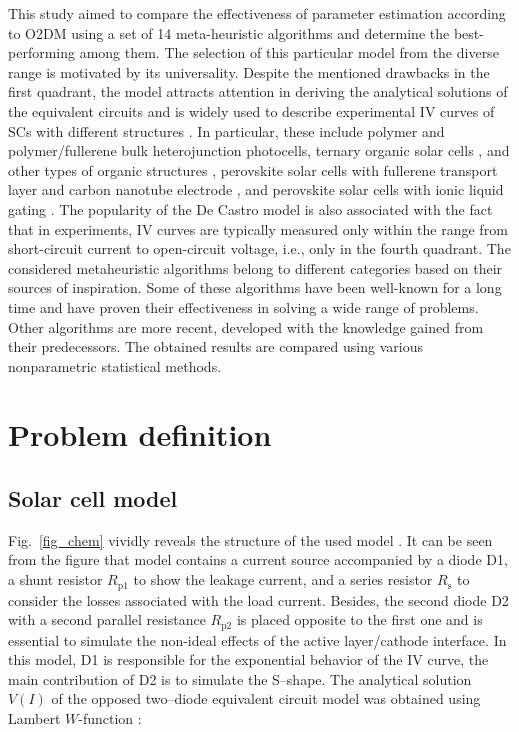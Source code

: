 \documentclass[a4paper,fleqn]{cas-dc}
\begin{document}
This study aimed to compare the effectiveness of parameter estimation according to O2DM\cite{Castro2010}
using a set of 14 meta-heuristic algorithms and determine the best-performing among them.
The selection of this particular model from the diverse range is motivated by its universality.
Despite the mentioned drawbacks in the first quadrant,
the model attracts attention in deriving the analytical solutions of the equivalent circuits \cite{Yu2019a}
and is widely used to describe experimental IV curves of SCs with different structures
\cite{CastroUseBook,Pillai2017,Arredondo2018,delPozo2012,BrenesBadilla2018,Tada2015Organic,Makha2018,CastroUsePerovskitIonikLiquid,CastroUsePerovskitFullerene}.
In particular, these include polymer \cite{Tada2015Organic}
and polymer/fullerene \cite{delPozo2012} bulk heterojunction photocells,
ternary organic solar cells \cite{Makha2018},
and other types of organic structures \cite{Pillai2017,Arredondo2018},
perovskite solar cells with fullerene transport layer and carbon nanotube electrode \cite{CastroUsePerovskitFullerene},
and perovskite solar cells with ionic liquid gating \cite{CastroUsePerovskitIonikLiquid}.
The popularity of the De Castro model is also associated with the fact that in experiments,
IV curves are typically measured only within the range
from short-circuit current to open-circuit voltage, i.e., only in the fourth quadrant.
The considered metaheuristic algorithms belong to different categories based on their sources of inspiration.
Some of these algorithms have been well-known for a long time and have proven their effectiveness in solving a wide range of problems.
Other algorithms are more recent, developed with the knowledge gained from their predecessors.
The obtained results are compared using various nonparametric statistical methods.



\section{Problem definition}\label{MM}
\subsection{Solar cell model}\label{SCModel}
Fig.~\ref{fig_chem}
vividly reveals the structure of the used model \cite{Castro2010}.
It can be seen from the figure that model contains a current source accompanied by a diode D1, a shunt
resistor $R_\mathrm{p1}$ to show the leakage current, and a series resistor $R_\mathrm{s}$ to consider the
losses associated with the load current.
Besides, the second diode D2 with a second parallel resistance $R_\mathrm{p2}$ is placed opposite to the first one and is essential to
simulate the non-ideal effects of the active layer/cathode interface.
In this model, D1 is responsible for the exponential behavior of the IV curve,
the main contribution of D2 is to simulate the S--shape.
The analytical solution $V(I)$ of the opposed two--diode equivalent circuit model was
 obtained \cite{CastroSolution} using Lambert $W$-function \cite{LambertNew}:
\end{document}
